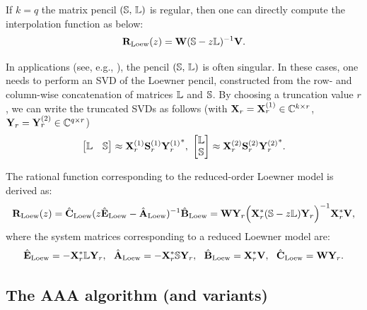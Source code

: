 \begin{lemma}
	If $k=q$ the matrix pencil $({{\mathbb S}},\,{\mathbb L})$ is regular, then one can directly compute the  interpolation function as below:
	\begin{equation}
	{\mathbf R}_{{\mathrm{Loew}}}(z)={\mathbf W}({{\mathbb S}}-z {\mathbb L})^{-1}{\mathbf V}.
	\end{equation}
\end{lemma}

In applications (see, e.g., \cite{morGosPA22}), the pencil $({{\mathbb S}},\,{\mathbb L})$ is often singular. In these cases, one needs to perform an SVD of the Loewner pencil, constructed from the row- and column-wise concatenation of matrices ${\mathbb L}$ and ${{\mathbb S}}$. By choosing a truncation value $r$, we can write the truncated SVDs as follows (with ${\mathbf X}_r = {\mathbf X}_r^{(1)} \in {\mathbb C}^{k \times r}$, ${\mathbf Y}_r = {\mathbf Y}_r^{(2)} \in {\mathbb C}^{q \times r}$)
\begin{equation}\label{eq:loew-rank}
\begin{bmatrix} \IL & \sIL \end{bmatrix} \approx \bX_r^{(1)} \bS_r^{(1)} {\bY_r^{(1)}}^* ,~
\begin{bmatrix} \IL \\ \sIL \end{bmatrix}  \approx \bX_r^{(2)} \bS_r^{(2)} {\bY_r^{(2)}}^*. %
\end{equation}	
\begin{lemma}			
	The rational function corresponding to the reduced-order Loewner model is derived as:
    \begin{align*}
	{\mathbf R}_{{\mathrm{Loew}}}(z) = \hat{{\mathbf C}}_{\mathrm{Loew}} (z \hat{{\mathbf E}}_{\mathrm{Loew}}-\hat{{\mathbf A}}_{\mathrm{Loew}})^{-1} \hat{{\mathbf B}}_{\mathrm{Loew}} 
    =  {\mathbf W} {\mathbf Y}_r \Big{(} {\mathbf X}_r^* ({{\mathbb S}}- z {\mathbb L}) {\mathbf Y}_r \Big{)}^{-1} {\mathbf X}_r^* {\mathbf V},
	\end{align*}
    where the system matrices corresponding to a reduced Loewner model are:
    	\begin{equation} \label{eq:Loew_red_mat}
	\hat{{\mathbf E}}_{\mathrm{Loew}} = -{\mathbf X}_r^*{\mathbb L} {\mathbf Y}_r, \ \  \hat{{\mathbf A}}_{\mathrm{Loew}} = -{\mathbf X}_r^*{{\mathbb S}} {\mathbf Y}_r, \ \
	\hat{{\mathbf B}}_{\mathrm{Loew}} = {\mathbf X}_r^*{\mathbf V}, \ \  \hat{{\mathbf C}}_{\mathrm{Loew}} = {\mathbf W} {\mathbf Y}_r.
	\end{equation}
\end{lemma}


\subsection{The AAA algorithm (and variants)}\label{sec:AAA}


